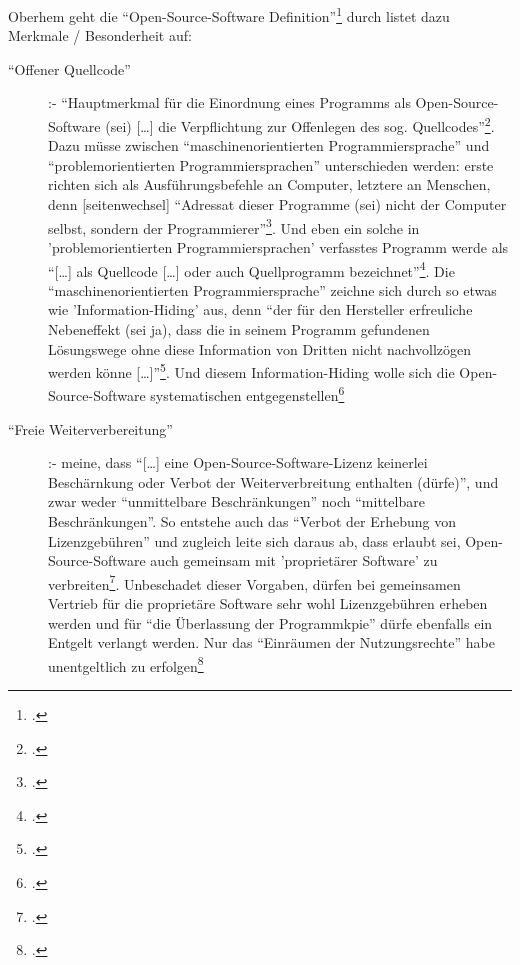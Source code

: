 \documentclass[DIV=calc,BCOR=5mm,11pt,headings=small,oneside,abstract=true, toc=bib]{scrartcl}
\begin{document}
Oberhem geht die \enquote{Open-Source-Software
Definition}\footcite[vgl.][10. Die Abwandlung des
originären Namens dürfte ihrer Einteilungvon Open Source als
Oberbegriff geschuldet sein]{Oberhem2008a} durch listet dazu Merkmale /
Besonderheit auf:

\begin{description}
  \item[``Offener Quellcode''] :- \enquote{Hauptmerkmal für die
  Einordnung eines Programms als Open-Source-Software (sei) [\ldots] die
  Verpflichtung zur Offenlegen des sog.
  Quellcodes}\footcite[vgl.][11]{Oberhem2008a}. Dazu müsse zwischen
  \enquote{maschinenorientierten Programmiersprache} und
  \enquote{problemorientierten Programmiersprachen} unterschieden werden:
  erste richten sich als Ausführungsbefehle an Computer, letztere an Menschen,
  denn [seitenwechsel] \enquote{Adressat dieser Programme (sei) nicht der Computer
  selbst, sondern der Programmierer}\footcite[vgl.][12f]{Oberhem2008a}.
  Und eben ein solche in 'problemorientierten Programmiersprachen' verfasstes
  Programm werde als \enquote{[\ldots] als Quellcode [\ldots] oder auch
  Quellprogramm bezeichnet}\footcite[vgl.][13]{Oberhem2008a}. Die
  \enquote{maschinenorientierten Programmiersprache} zeichne sich durch so
  etwas wie 'Information-Hiding' aus, denn \enquote{der für den Hersteller
  erfreuliche Nebeneffekt (sei ja), dass die in seinem Programm
  gefundenen Lösungswege ohne diese Information von Dritten nicht
  nachvollzögen werden könne [\ldots]}\footcite[vgl.][12]{Oberhem2008a}.
  Und diesem Information-Hiding wolle sich die Open-Source-Software
  systematischen entgegenstellen\footcite[vgl.][13]{Oberhem2008a}
  \item[``Freie Weiterverbereitung''] :- meine, dass \enquote{[\ldots]
  eine Open-Source-Software-Lizenz keinerlei Beschärnkung oder Verbot der
  Weiterverbreitung enthalten (dürfe)}, und zwar weder
  \enquote{unmittelbare Beschränkungen} noch \enquote{mittelbare
  Beschränkungen}. So entstehe auch das \enquote{Verbot der Erhebung
  von Lizenzgebühren} und zugleich leite sich daraus ab, dass erlaubt sei,
  Open-Source-Software auch gemeinsam mit  'proprietärer Software' zu
  verbreiten\footcite[vgl.][13]{Oberhem2008a}. Unbeschadet dieser Vorgaben,
  dürfen bei gemeinsamen Vertrieb für die proprietäre Software sehr wohl
  Lizenzgebühren erheben werden und für \enquote{die Überlassung der
  Programmkpie} dürfe ebenfalls ein Entgelt verlangt werden. Nur das
  \enquote{Einräumen der Nutzungsrechte} habe unentgeltlich zu
  erfolgen\footcite[vgl.][14]{Oberhem2008a}

\end{description}
\end{document}
